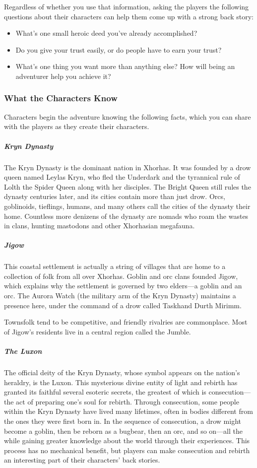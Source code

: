 \documentclass[10pt,a4paper,twoside,fancy,bg=print,twocolumn,openany,nodeprecatedcode]{dndbook}
\begin{document}
Regardless of whether you use that information, asking the players the following questions about their characters can help them come up with a strong back story:


\begin{itemize}
\item What's one small heroic deed you've already accomplished?
\item Do you give your trust easily, or do people have to earn your trust?
\item What's one thing you want more than anything else? How will being an adventurer help you achieve it?
\end{itemize}

\subsubsection{What the Characters Know}
Characters begin the adventure knowing the following facts, which you can share with the players as they create their characters.

\subparagraph{Kryn Dynasty}
The Kryn Dynasty is the dominant nation in Xhorhas. It was founded by a drow queen named Leylas Kryn, who fled the Underdark and the tyrannical rule of Lolth the Spider Queen along with her disciples. The Bright Queen still rules the dynasty centuries later, and its cities contain more than just drow. Orcs, goblinoids, tieflings, humans, and many others call the cities of the dynasty their home. Countless more denizens of the dynasty are nomads who roam the wastes in clans, hunting mastodons and other Xhorhasian megafauna.

\subparagraph{Jigow}
This coastal settlement is actually a string of villages that are home to a collection of folk from all over Xhorhas. Goblin and orc clans founded Jigow, which explains why the settlement is governed by two elders—a goblin and an orc. The Aurora Watch (the military arm of the Kryn Dynasty) maintains a presence here, under the command of a drow called Taskhand Durth Mirimm.

Townsfolk tend to be competitive, and friendly rivalries are commonplace. Most of Jigow's residents live in a central region called the Jumble.

\subparagraph{The Luxon}
The official deity of the Kryn Dynasty, whose symbol appears on the nation's heraldry, is the Luxon. This mysterious divine entity of light and rebirth has granted its faithful several esoteric secrets, the greatest of which is consecution—the act of preparing one's soul for rebirth. Through consecution, some people within the Kryn Dynasty have lived many lifetimes, often in bodies different from the ones they were first born in. In the sequence of consecution, a drow might become a goblin, then be reborn as a bugbear, then an orc, and so on—all the while gaining greater knowledge about the world through their experiences. This process has no mechanical benefit, but players can make consecution and rebirth an interesting part of their characters' back stories.
\end{document}
